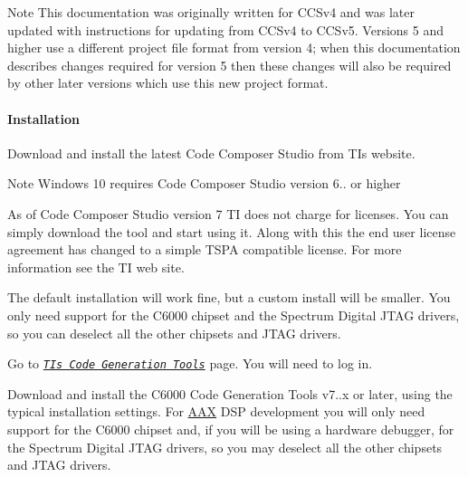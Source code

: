 \begin{DoxyNote}{Note}
This documentation was originally written for C\+C\+Sv4 and was later updated with instructions for updating from C\+C\+Sv4 to C\+C\+Sv5. Versions 5 and higher use a different project file format from version 4; when this documentation describes changes required for version 5 then these changes will also be required by other later versions which use this new project format.
\end{DoxyNote}
\hypertarget{a00362_subsubsection__installation_}{}\paragraph{Installation}\label{a00362_subsubsection__installation_}

\begin{DoxyEnumerate}
\item Download and install the latest Code Composer Studio from T\+I\textquotesingle{}s website.

\begin{DoxyNote}{Note}
Windows 10 requires Code Composer Studio version 6.. or higher

As of Code Composer Studio version 7 T\+I does not charge for licenses. You can simply download the tool and start using it. Along with this the end user license agreement has changed to a simple T\+S\+P\+A compatible license. For more information see the T\+I web site.  
\end{DoxyNote}

\item The default installation will work fine, but a custom install will be smaller. You only need support for the C6000 chipset and the Spectrum Digital J\+T\+A\+G drivers, so you can deselect all the other chipsets and J\+T\+A\+G drivers.  
\item Go to{\itshape  } {\itshape  \href{https://www-a.ti.com/downloads/sds_support/TICodegenerationTools/download.htm}{\tt T\+I\textquotesingle{}s Code Generation Tools}} {\itshape  } page. You will need to log in. 
\item Download and install the C6000 Code Generation Tools v7..\+x or later, using the typical installation settings. For \hyperlink{a00288}{A\+A\+X} D\+S\+P development you will only need support for the C6000 chipset and, if you will be using a hardware debugger, for the Spectrum Digital J\+T\+A\+G drivers, so you may deselect all the other chipsets and J\+T\+A\+G drivers.



\end{DoxyEnumerate}

